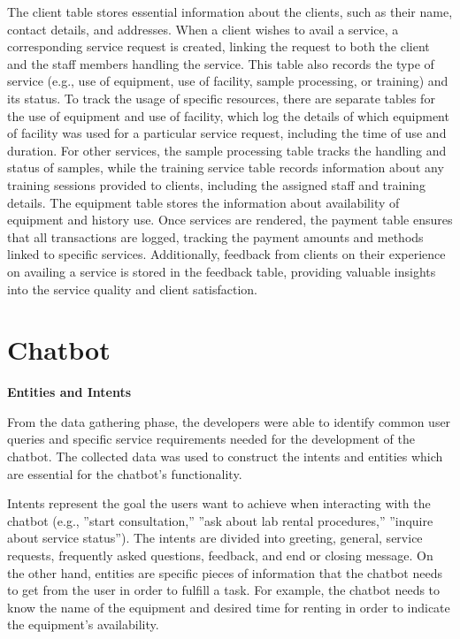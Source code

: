 The client table stores essential information about the clients, such as their name, contact details, and addresses. When a client wishes to avail a service, a corresponding service request is created, linking the request to both the client and the staff members handling the service. This table also records the type of service (e.g., use of equipment, use of facility, sample processing, or training) and its status. To track the usage of specific resources, there are separate tables for the use of equipment and use of facility, which log the details of which equipment of facility was used for a particular service request, including the time of use and duration. For other services, the sample processing table tracks the handling and status of samples, while the training service table records information about any training sessions provided to clients, including the assigned staff and training details. The equipment table stores the information about availability of equipment and history use. Once services are rendered, the payment table ensures that all transactions are logged, tracking the payment amounts and methods linked to specific services. Additionally, feedback from clients on their experience on availing a service is stored in the feedback table, providing valuable insights into the service quality and client satisfaction.

\newpage

\section{Chatbot}

\textbf{Entities and Intents}

From the data gathering phase, the developers were able to identify common user queries and specific service requirements needed for the development of the chatbot. The collected data was used to construct the intents and entities which are essential for the chatbot’s functionality. 

Intents represent the goal the users want to achieve when interacting with the chatbot (e.g., ”start consultation,” ”ask about lab rental procedures,” ”inquire about service status”). The intents are divided into greeting, general, service requests, frequently asked questions, feedback, and end or closing message. On the other hand, entities are specific pieces of information that the chatbot needs to get from the user in order to fulfill a task. For example, the chatbot needs to know the name of the equipment and desired time for renting in order to indicate the equipment's availability. 

